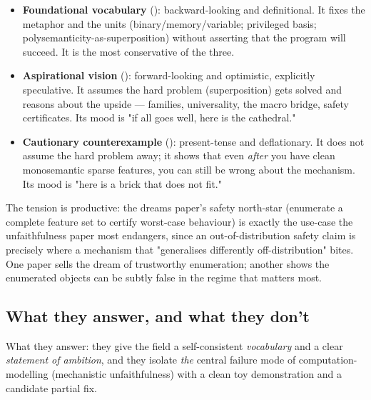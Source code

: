 \begin{itemize}
\item \textbf{Foundational vocabulary} (\textcite{mech-interp-variables-bases}): backward-looking and definitional. It fixes the metaphor and the units (binary/memory/variable; privileged basis; polysemanticity-as-superposition) without asserting that the program will succeed. It is the most conservative of the three.
\item \textbf{Aspirational vision} (\textcite{interpretability-dreams}): forward-looking and optimistic, explicitly speculative. It assumes the hard problem (superposition) gets solved and reasons about the upside --- families, universality, the macro bridge, safety certificates. Its mood is "if all goes well, here is the cathedral."
\item \textbf{Cautionary counterexample} (\textcite{toy-model-of-mechanistic-unfaithfulness}): present-tense and deflationary. It does not assume the hard problem away; it shows that even \emph{after} you have clean monosemantic sparse features, you can still be wrong about the mechanism. Its mood is "here is a brick that does not fit."
\end{itemize}

The tension is productive: the dreams paper's safety north-star (enumerate a complete feature set to certify worst-case behaviour) is exactly the use-case the unfaithfulness paper most endangers, since an out-of-distribution safety claim is precisely where a mechanism that "generalises differently off-distribution" bites. One paper sells the dream of trustworthy enumeration; another shows the enumerated objects can be subtly false in the regime that matters most.


\subsection*{What they answer, and what they don't}

What they answer: they give the field a self-consistent \emph{vocabulary} and a clear \emph{statement of ambition}, and they isolate \emph{the} central failure mode of computation-modelling (mechanistic unfaithfulness) with a clean toy demonstration and a candidate partial fix.

